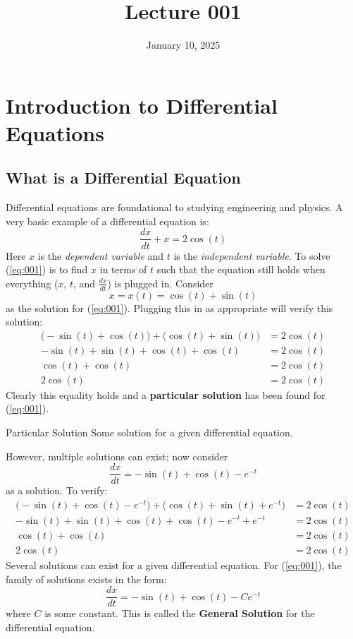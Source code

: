 \documentclass[12pt]{article}
\title{Lecture 001}
\date{January 10, 2025}
\begin{document}
\section{Introduction to Differential Equations}
\label{sec:introductionToDifferentialEquations}

\subsection{What is a Differential Equation}
\label{ssec:whatIsADifferentialEquation}

Differential equations are foundational to studying engineering and physics. A very basic example of a differential equation is:
\begin{equation}
  \frac{dx}{dt} + x = 2 \cos(t)
  \label{eq:001}
\end{equation}
Here $x$ is the \textit{dependent variable} and $t$ is the \textit{independent variable}. To solve (\ref{eq:001}) is to find $x$ in terms of $t$ such that the equation still holds when everything ($x$, $t$, and $\frac{dx}{dt}$) is plugged in. Consider 
\begin{equation*}
  x=x(t)=\cos (t) + \sin (t)
\end{equation*}
as the solution for (\ref{eq:001}). Plugging this in as appropriate will verify this solution:
\begin{align*}
  \big(-\sin(t)+\cos(t)\big) + \big(\cos(t)+\sin(t)\big) &= 2\cos(t) \\
  -\sin(t) + \sin(t) + \cos(t) + \cos(t) &= 2\cos(t) \\
  \cos(t) + \cos(t) &= 2\cos(t) \\
  2\cos(t) &= 2\cos(t)
\end{align*}
Clearly this equality holds and a \textbf{particular solution} has been found for (\ref{eq:001}).

\begin{definition}{Particular Solution}
  Some solution for a given differential equation.
\end{definition}

However, multiple solutions can exist; now consider
\begin{equation*}
  \frac{dx}{dt} = -\sin(t) + \cos(t) - e^{-t}
\end{equation*}
as a solution. To verify:
\begin{align*}
  \big(-\sin(t) + \cos(t) - e^{-t}\big) + \big(\cos(t) + \sin(t) + e^{-t}\big) &= 2\cos(t) \\
  -\sin(t) + \sin(t) + \cos(t) + \cos(t) - e^{-t} + e^{-t} &= 2\cos(t) \\
  \cos(t) + \cos(t) &= 2\cos(t) \\
  2\cos(t) &= 2\cos(t)
\end{align*}
Several solutions can exist for a given differential equation. For (\ref{eq:001}), the family of solutions exists in the form:
\begin{equation*}
  \frac{dx}{dt} = -\sin(t) + \cos(t) - Ce^{-t}
\end{equation*}
where $C$ is some constant. This is called the \textbf{General Solution} for the differential equation.
\end{document}
